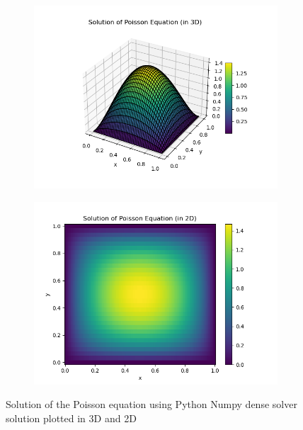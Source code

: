 \documentclass[unicode,11pt,a4paper,oneside,numbers=endperiod,openany]{scrartcl}
\begin{document}
\begin{figure}[H]
\centering
\begin{subfigure}[b]{0.45\textwidth} %
	\centering
	\includegraphics[width=\textwidth]{../src-5/poisson/solution_dn_dir_3d.png} %
\end{subfigure}
\hfill %
\begin{subfigure}[b]{0.45\textwidth} %
	\centering
	\includegraphics[width=\textwidth]{../src-5/poisson/solution_dn_dir.png} %
\end{subfigure}
\caption{Solution of the Poisson equation using Python Numpy dense solver solution plotted in 3D and 2D}
\end{figure}
\end{document}
